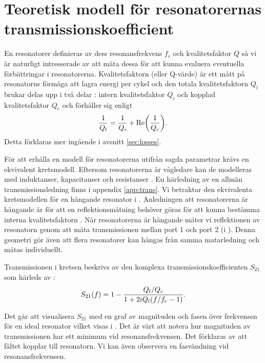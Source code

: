 \documentclass[main.tex]{subfiles}
\begin{document}
\section{Teoretisk modell för resonatorernas transmissionskoefficient}
\label{sec:res_teori}


En resonatorer definieras av dess resonansfrekvens $f_r$ och kvalitetsfaktor $Q$ \cite[s. 3]{Boehme2016} så vi är naturligt intresserade av att mäta dessa för att kunna evaluera eventuella förbättringar i resonatorerna. Kvalitetsfaktorn (eller Q-värde) är ett mått på resonatorns förmåga att lagra energi per cykel och den totala kvalitetsfaktorn $Q_l$ brukar delas upp i två delar \cite{Probst2015}: intern kvalitetsfaktor $Q_i$ och kopplad kvalitetsfaktor $Q_c$ och förhåller sig enligt 
\begin{equation}
\frac{1}{Q_l}=\frac{1}{Q_i}+\text{Re}\qty(\frac{1}{Q_c}).
\end{equation}
Detta förklaras mer ingående i avsnitt \ref{sec:losses}.

För att erhålla en modell för resonatorerna utifrån sagda parametrar krävs en ekvivalent kretsmodell. Eftersom resonatorerna är vågledare kan de modelleras med induktanser, kapacitanser och resistanser \cite[s. 437]{cheng}. En härledning av en allmän transmissionsledning finns i appendix \ref{app:trans}. Vi betraktar den ekvivalenta kretsmodellen för en hängande resonator \cite{Boehme2016} i . Anledningen att resonatorerna är hängande är för att en reflektionsmätning behöver göras för att kunna bestämma interna kvalitetsfaktorn \cite{Probst2015}. När resonatorerna är hängande mäter vi reflektionen av resonatorn genom att mäta transmissionen mellan port 1 och port 2 (i ). Denna geometri gör även att flera resonatorer kan hängas från samma matarledning och mätas individuellt.

Transmissionen i kretsen beskrivs av den komplexa transmissionskoefficienten $S_{21}$ som härleds av \citeauthor{Boehme2016} \cite[s. 38]{Boehme2016}:
\begin{equation}
    S_{21}(f)=1-\frac{Q_l/Q_c}{1+2iQ_l\qty(f/f_r-1)}.
\label{eq:S21_ideal}
\end{equation}

Det går att visualisera $S_{21}$ med en graf av magnituden och fasen över frekvensen för en ideal resonator vilket visas i . Det är värt att notera hur magnituden av transmissionen har ett minimum vid resonansfrekvensen. Det förklaras av att fältet kopplar till resonatorn. Vi kan även observera en fasvändning vid resonansfrekvensen.
\end{document}
